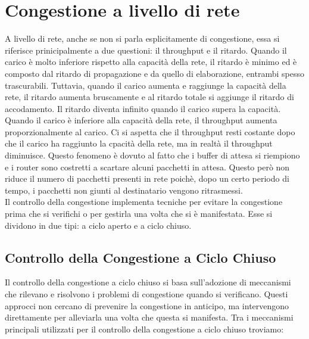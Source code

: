 \documentclass[12pt]{report}
\begin{document}
	\section{Congestione a livello di rete}
	A livello di rete, anche se non si parla esplicitamente di congestione, essa si riferisce prinicipalmente a due questioni: il throughput e il ritardo. Quando il carico è molto inferiore rispetto alla capacità della rete, il ritardo è minimo ed è composto dal ritardo di propagazione e da quello di elaborazione, entrambi spesso trascurabili. Tuttavia, quando il carico aumenta e raggiunge la capacità della rete, il ritardo aumenta bruscamente e al ritardo totale si aggiunge il ritardo di accodamento. Il ritardo diventa infinito quando il carico supera la capacità.
	\vspace{\baselineskip}\\
	Quando il carico è inferiore alla capacità della rete, il throughput aumenta proporzionalmente al carico. Ci si aspetta che il throughput resti costante dopo che il carico  ha raggiunto la cpacità della rete, ma in realtà il throughput diminuisce. Questo fenomeno è dovuto al fatto che i buffer di attesa si riempiono e i router sono costretti a scartare alcuni pacchetti in attesa. Questo però non riduce il numero di pacchetti presenti in rete poichè, dopo un certo periodo di tempo, i pacchetti non giunti al destinatario vengono ritrasmessi.
	\vspace{\baselineskip}\\
	Il controllo della congestione implementa tecniche per evitare la congestione prima che si verifichi o per gestirla una volta che si è manifestata. Esse si dividono in due tipi: a ciclo aperto e a ciclo chiuso.

	\subsection{Controllo della Congestione a Ciclo Chiuso}

Il controllo della congestione a ciclo chiuso si basa sull'adozione di meccanismi che rilevano e risolvono i problemi di congestione quando si verificano. Questi approcci non cercano di prevenire la congestione in anticipo, ma intervengono direttamente per alleviarla una volta che questa si manifesta. Tra i meccanismi principali utilizzati per il controllo della congestione a ciclo chiuso troviamo:
\end{document}
